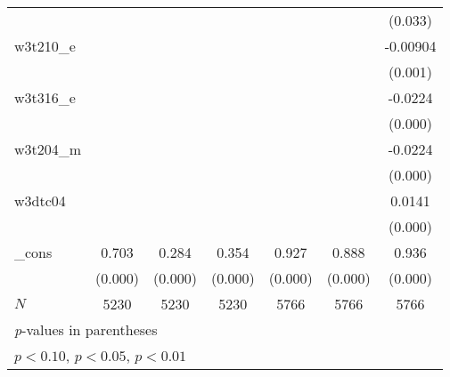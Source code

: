 {\begin{tabular}{l*{6}{c}}
            &                     &                     &                     &                     &                     &     (0.033)         \\
[1em]
w3t210\_e    &                     &                     &                     &                     &                     &    -0.00904\sym{***}\\
            &                     &                     &                     &                     &                     &     (0.001)         \\
[1em]
w3t316\_e    &                     &                     &                     &                     &                     &     -0.0224\sym{***}\\
            &                     &                     &                     &                     &                     &     (0.000)         \\
[1em]
w3t204\_m    &                     &                     &                     &                     &                     &     -0.0224\sym{***}\\
            &                     &                     &                     &                     &                     &     (0.000)         \\
[1em]
w3dtc04     &                     &                     &                     &                     &                     &      0.0141\sym{***}\\
            &                     &                     &                     &                     &                     &     (0.000)         \\
[1em]
\_cons      &       0.703\sym{***}&       0.284\sym{***}&       0.354\sym{***}&       0.927\sym{***}&       0.888\sym{***}&       0.936\sym{***}\\
            &     (0.000)         &     (0.000)         &     (0.000)         &     (0.000)         &     (0.000)         &     (0.000)         \\
\hline
\(N\)       &        5230         &        5230         &        5230         &        5766         &        5766         &        5766         \\
\hline\hline
\multicolumn{7}{l}{\footnotesize \textit{p}-values in parentheses}\\
\multicolumn{7}{l}{\footnotesize \sym{*} \(p<0.10\), \sym{**} \(p<0.05\), \sym{***} \(p<0.01\)}\\
\end{tabular}
}
